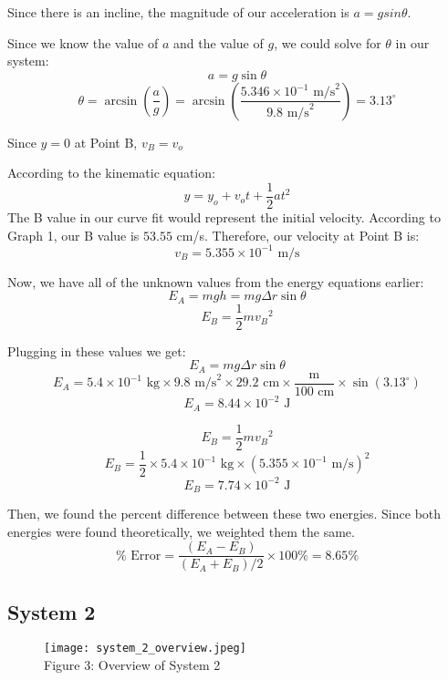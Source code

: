 \documentclass[fleqn]{article}
\begin{document}
Since there is an incline, the magnitude of our acceleration is $a=gsin \theta$.

Since we know the value of $a$ and the value of $g$, we could solve for $\theta$ in our system:
\[ a=g \sin \theta \]
\[
	\theta =
	\arcsin \left( \frac{a}{g}  \right) =
	\arcsin \left( \frac{5.346 \times 10^{-1} \text{ m/s}^2 }{9.8 \text{ m/s}^2 }  \right)
	=3.13^\circ
\]

Since $y=0$ at Point B, $v_B=v_o$

According to the kinematic equation:
\[ y=y_o+v_ot+\frac{1}{2} at^2 \]
The B value in our curve fit would represent the initial velocity. According to Graph 1, our B value is $53.55$ cm/s. Therefore, our velocity at Point B is:
\[ v_B=5.355\times 10^{-1} \text{ m/s}  \]

Now, we have all of the unknown values from the energy equations earlier:
\[ E_A=mgh=mg \Delta r \sin \theta \]
\[ E_B=\frac{1}{2} m{v_B}^2 \]

Plugging in these values we get:
\[ E_A = mg \Delta r \sin \theta \]
\[ E_A = 5.4 \times 10^{-1} \text{ kg}
	\times 9.8 \text{ m/s}^2
	\times 29.2 \text{ cm} \times \frac{\text{m} }{100 \text{ cm} }
	\times \sin \left( 3.13^\circ \right)
\]
\[ E_A = 8.44 \times 10^{-2} \text{ J}  \]

\[ E_B=\frac{1}{2} m{v_B}^2 \]
\[ E_B=\frac{1}{2} \times
	5.4 \times 10^{-1} \text{ kg} \times
	\left( 5.355 \times 10^{-1} \text{ m/s} \right)^2
\]
\[ E_B = 7.74 \times 10^{-2} \text{ J}  \]

Then, we found the percent difference between these two energies. Since both energies were found theoretically, we weighted them the same.
\[ \% \text{ Error}  = \frac{(E_A - E_B)}{(E_A+E_B)/2} \times 100 \%
	=8.65\%
\]

\subsection*{System 2}
\begin{figure}[H]
	\texttt{[image: system\_2\_overview.jpeg]}
	\\Figure 3: Overview of System 2
\end{figure}
\end{document}

